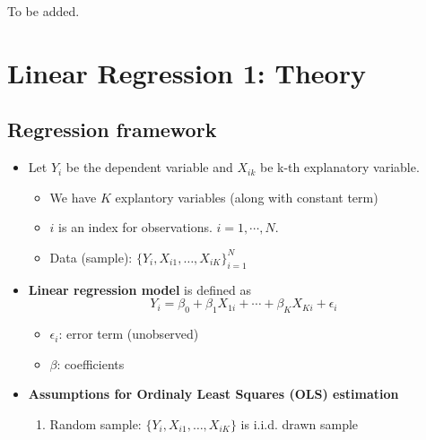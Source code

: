 \documentclass[]{book}
\providecommand{\tightlist}{%
  \setlength{\itemsep}{0pt}\setlength{\parskip}{0pt}}
\begin{document}
To be added.

\hypertarget{linear-regression-1-theory}{%
\chapter{Linear Regression 1: Theory}\label{linear-regression-1-theory}}

\hypertarget{regression-framework}{%
\section{Regression framework}\label{regression-framework}}

\begin{itemize}
\tightlist
\item
  Let \(Y_i\) be the dependent variable and \(X_{ik}\) be k-th explanatory variable.

  \begin{itemize}
  \tightlist
  \item
    We have \(K\) explantory variables (along with constant term)
  \item
    \(i\) is an index for observations. \(i = 1,\cdots, N\).
  \item
    Data (sample): \(\{ Y_i , X_{i1}, \ldots, X_{iK} \}_{i=1}^N\)
  \end{itemize}
\item
  \textbf{Linear regression model} is defined as
  \[ Y_{i}=\beta_{0}+\beta_{1}X_{1i}+\cdots+\beta_{K}X_{Ki}+\epsilon_{i} \]

  \begin{itemize}
  \tightlist
  \item
    \(\epsilon_i\): error term (unobserved)
  \item
    \(\beta\): coefficients
  \end{itemize}
\item
  \textbf{Assumptions for Ordinaly Least Squares (OLS) estimation}

  \begin{enumerate}
  \def\labelenumi{\arabic{enumi}.}
  \tightlist
  \item
    Random sample: \(\{ Y_i , X_{i1}, \ldots, X_{iK} \}\) is i.i.d. drawn sample


\end{enumerate}
\end{itemize}
\end{document}
